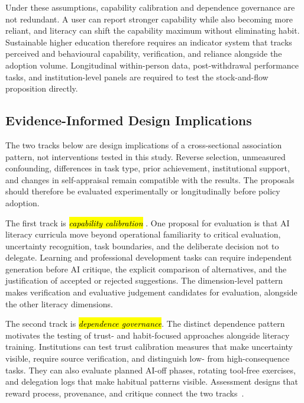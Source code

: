 \documentclass[sustainability,article,accept,moreauthors]{Definitions/mdpi}
\begin{document}
Under these assumptions, capability calibration and dependence governance are not redundant. A user can report stronger capability while also becoming more reliant, and literacy can shift the capability maximum without eliminating habit. Sustainable higher education therefore requires an indicator system that tracks perceived and behavioural capability, verification, and reliance alongside the adoption volume. Longitudinal within-person data, post-withdrawal performance tasks, and institution-level panels are required to test the stock-and-flow proposition directly.

\subsection{Evidence-Informed Design Implications}\label{sec:implications}

The two tracks below are design implications of a cross-sectional association pattern, not interventions tested in this study. Reverse selection, unmeasured confounding, differences in task type, prior achievement, institutional support, and changes in self-appraisal remain compatible with the results. The proposals should therefore be evaluated experimentally or longitudinally before policy adoption.

The first track is \emph{\hl{capability calibration}%
}. One proposal for evaluation is that AI literacy curricula move beyond operational familiarity to critical evaluation, uncertainty recognition, task boundaries, and the deliberate decision not to delegate. Learning and professional development tasks can require independent generation before AI critique, the explicit comparison of alternatives, and the justification of accepted or rejected suggestions. The dimension-level pattern makes verification and evaluative judgement candidates for evaluation, alongside the other literacy dimensions.

The second track is \emph{\hl{dependence governance}}. The distinct dependence pattern motivates the testing of trust- and habit-focused approaches alongside literacy training. Institutions can test trust calibration measures that make uncertainty visible, require source verification, and distinguish low- from high-consequence tasks. They can also evaluate planned AI-off phases, rotating tool-free exercises, and delegation logs that make habitual patterns visible. Assessment designs that reward process, provenance, and critique connect the two tracks~\cite{joseph2025}.
\end{document}
